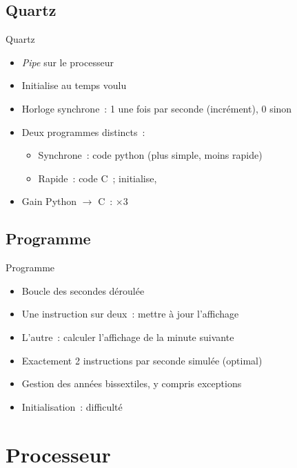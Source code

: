 \documentclass[11pt]{beamer}
\begin{document}
\subsection{Quartz}

\begin{frame}{Quartz}
\begin{itemize}
\item \textit{Pipe} sur le processeur
\item Initialise au temps voulu
\item Horloge synchrone~: \alert{1} une fois par seconde (incrément), \alert{0} sinon
\item Deux programmes distincts~:
	\begin{itemize}
	\item Synchrone~: code python (plus simple, moins rapide)
	\item Rapide~: code C~; initialise, 
	\end{itemize}
\item Gain Python $\rightarrow$ C~: $\times 3$
\end{itemize}
\end{frame}

\subsection{Programme}
\begin{frame}{Programme}
\begin{itemize}
\item{Boucle des secondes déroulée}
\item{Une instruction sur deux~: mettre à jour l'affichage}
\item{L'autre~: calculer l'affichage de la minute suivante}
\item{Exactement 2 instructions par seconde simulée (optimal)}
\item{Gestion des années bissextiles, y compris exceptions}
\item{Initialisation~: difficulté}
\end{itemize}
\end{frame}


\section{Processeur}



\end{document}
